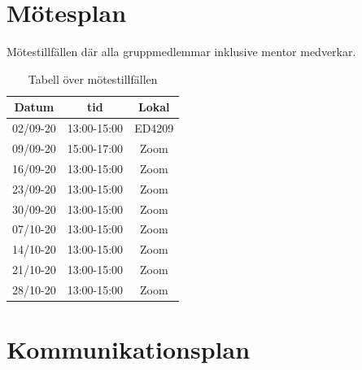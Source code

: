 \documentclass[a4paper]{article}
\begin{document}
\newpage

\section{Mötesplan}

Mötestillfällen där alla gruppmedlemmar inklusive mentor medverkar.

\begin{table}[H]
    \begin{center}
        \begin{tabular}{ |c|c|c| }\hline
            Datum & tid & Lokal \\\hline\hline
            02/09-20 & 13:00-15:00 & ED4209 \\\hline
            09/09-20 & 15:00-17:00 & Zoom \\\hline
            16/09-20 & 13:00-15:00 & Zoom \\\hline
            23/09-20 & 13:00-15:00 & Zoom \\\hline
            30/09-20 & 13:00-15:00 & Zoom \\\hline
            07/10-20 & 13:00-15:00 & Zoom \\\hline
            14/10-20 & 13:00-15:00 & Zoom \\\hline
            21/10-20 & 13:00-15:00 & Zoom \\\hline
            28/10-20 & 13:00-15:00 & Zoom \\\hline
        \end{tabular}
        \caption{Tabell över mötestillfällen}
        \label{table:motesplan}
    \end{center}
\end{table}

\section{Kommunikationsplan}
\end{document}
